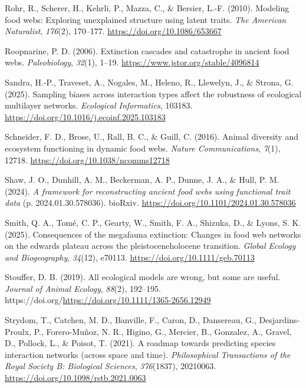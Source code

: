 \documentclass[
]{article}
\newlength{\cslhangindent}
\newenvironment{CSLReferences}[2] %
 {\begin{list}{}{%
  \setlength{\itemindent}{0pt}
  \setlength{\leftmargin}{0pt}
  \setlength{\parsep}{0pt}
  \ifodd #1
   \setlength{\leftmargin}{\cslhangindent}
   \setlength{\itemindent}{-1\cslhangindent}
  \fi
  \setlength{\itemsep}{#2\baselineskip}}}
 {\end{list}}
\begin{document}
\begin{CSLReferences}{1}{0}
Rohr, R., Scherer, H., Kehrli, P., Mazza, C., \& Bersier, L.-F. (2010).
Modeling food webs: Exploring unexplained structure using latent traits.
\emph{The American Naturalist}, \emph{176}(2), 170--177.
\url{https://doi.org/10.1086/653667}

Roopnarine, P. D. (2006). Extinction cascades and catastrophe in ancient
food webs. \emph{Paleobiology}, \emph{32}(1), 1--19.
\url{https://www.jstor.org/stable/4096814}

Sandra, H.-P., Traveset, A., Nogales, M., Heleno, R., Llewelyn, J., \&
Strona, G. (2025). Sampling biases across interaction types affect the
robustness of ecological multilayer networks. \emph{Ecological
Informatics}, 103183. \url{https://doi.org/10.1016/j.ecoinf.2025.103183}

Schneider, F. D., Brose, U., Rall, B. C., \& Guill, C. (2016). Animal
diversity and ecosystem functioning in dynamic food webs. \emph{Nature
Communications}, \emph{7}(1), 12718.
\url{https://doi.org/10.1038/ncomms12718}

Shaw, J. O., Dunhill, A. M., Beckerman, A. P., Dunne, J. A., \& Hull, P.
M. (2024). \emph{A framework for reconstructing ancient food webs using
functional trait data} (p. 2024.01.30.578036). bioRxiv.
\url{https://doi.org/10.1101/2024.01.30.578036}

Smith, Q. A., Tomé, C. P., Gearty, W., Smith, F. A., Shizuka, D., \&
Lyons, S. K. (2025). Consequences of the megafauna extinction: Changes
in food web networks on the edwards plateau across the
pleistocene{\textendash}holocene transition. \emph{Global Ecology and
Biogeography}, \emph{34}(12), e70113.
\url{https://doi.org/10.1111/geb.70113}

Stouffer, D. B. (2019). All ecological models are wrong, but some are
useful. \emph{Journal of Animal Ecology}, \emph{88}(2), 192--195.
https://doi.org/\url{https://doi.org/10.1111/1365-2656.12949}

Strydom, T., Catchen, M. D., Banville, F., Caron, D., Dansereau, G.,
Desjardins-Proulx, P., Forero-Muñoz, N. R., Higino, G., Mercier, B.,
Gonzalez, A., Gravel, D., Pollock, L., \& Poisot, T. (2021). A roadmap
towards predicting species interaction networks (across space and time).
\emph{Philosophical Transactions of the Royal Society B: Biological
Sciences}, \emph{376}(1837), 20210063.
\url{https://doi.org/10.1098/rstb.2021.0063}


\end{CSLReferences}
\end{document}
